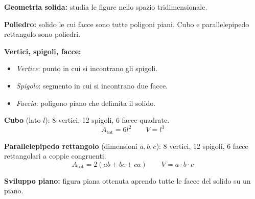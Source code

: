 \begin{tcolorbox}[
        enhanced, breakable,
        colback  = azzurro,
        colframe = blu,
        fonttitle = \bfseries,
        title    = {Riepilogo — Geometria solida},
    ]

    \textbf{Geometria solida:} studia le figure nello spazio tridimensionale.

    \medskip
    \textbf{Poliedro:} solido le cui facce sono tutte poligoni piani. Cubo e parallelepipedo rettangolo sono poliedri.

    \medskip
    \textbf{Vertici, spigoli, facce:}
    \begin{itemize}[leftmargin=1.4em, nosep]
        \item \emph{Vertice}: punto in cui si incontrano gli spigoli.
        \item \emph{Spigolo}: segmento in cui si incontrano due facce.
        \item \emph{Faccia}: poligono piano che delimita il solido.
    \end{itemize}

    \medskip
    \textbf{Cubo} (lato $l$): 8 vertici, 12 spigoli, 6 facce quadrate.
    \[
        A_{\text{tot}} = 6l^2 \qquad V = l^3
    \]

    \textbf{Parallelepipedo rettangolo} (dimensioni $a,b,c$): 8 vertici, 12 spigoli, 6 facce rettangolari a coppie congruenti.
    \[
        A_{\text{tot}} = 2(ab+bc+ca) \qquad V = a \cdot b \cdot c
    \]

    \medskip
    \textbf{Sviluppo piano:} figura piana ottenuta aprendo tutte le facce del solido su un piano.

\end{tcolorbox}
